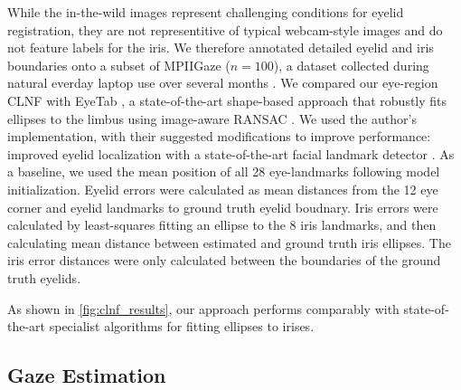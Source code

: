 While the in-the-wild images represent challenging conditions for eyelid registration, they are not representitive of typical webcam-style images and do not feature labels for the iris. We therefore annotated detailed eyelid and iris boundaries onto a subset of MPIIGaze ($n\!=\!100$), a dataset collected during natural everday laptop use over several months \cite{zhang15_cvpr}. We compared our eye-region CLNF with EyeTab \cite{wood2014eyetab}, a state-of-the-art shape-based approach that robustly fits ellipses to the limbus using image-aware RANSAC \cite{swirski2012robust}. We used the author's implementation, with their suggested modifications to improve performance: improved eyelid localization with a state-of-the-art facial landmark detector \cite{baltrusaitis2013constrained}. As a baseline, we used the mean position of all 28 eye-landmarks following model initialization. Eyelid errors were calculated as mean distances from the 12 eye corner and eyelid landmarks to ground truth eyelid boudnary. Iris errors were calculated by least-squares fitting an ellipse to the 8 iris landmarks, and then calculating mean distance between estimated and ground truth iris ellipses. The iris error distances were only calculated between the boundaries of the ground truth eyelids.


As shown in \autoref{fig:clnf_results}, our approach performs comparably with state-of-the-art specialist algorithms for fitting ellipses to irises.



\subsection{Gaze Estimation}



